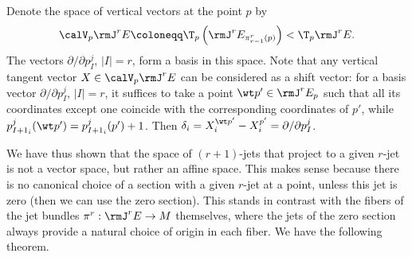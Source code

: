 Denote the space of vertical vectors at the point $p$ by 
\[\calV_p\rmJ^rE\coloneqq \T_p\left(\rmJ^rE_{\pi^r_{r-1}(p)}\right)<\T_p \rmJ^rE.\]
The vectors $\partial/\partial p_I^j$, $|I|=r$, form a basis in this space. Note that any vertical tangent vector $X\in \calV_p\rmJ^rE$ can be considered as a shift vector: for a basis vector $\partial/\partial p_I^j$, $|I|=r$, it suffices to take a point $\wt p'\in \rmJ^rE_p$ such that all its coordinates except one coincide with the corresponding coordinates of $p'$, while $p^j_{I+1_i}(\wt p')=p^j_{I+1_i}(p')+1$. Then $\delta_i=X_i^{\wt p'}-X_i^{p'}=\partial/\partial p^j_I$.

We have thus shown that the space of $(r+1)$-jets that project to a given $r$-jet is not a vector space, but rather an affine space. This makes sense because there is no canonical choice of a section with a given $r$-jet at a point, unless this jet is zero (then we can use the zero section). This stands in contrast with the fibers of the jet bundles $\pi^r:\rmJ^rE\to M$ themselves, where the jets of the zero section always provide a natural choice of origin in each fiber. We have the following theorem.


